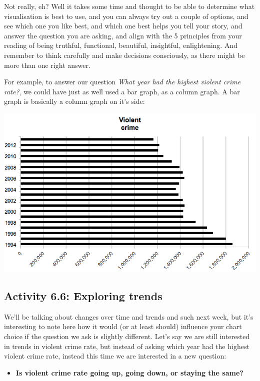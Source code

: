 \documentclass[
]{book}
\providecommand{\tightlist}{%
  \setlength{\itemsep}{0pt}\setlength{\parskip}{0pt}}
\begin{document}
Not really, eh? Well it takes some time and thought to be able to determine what visualisation is best to use, and you can always try out a couple of options, and see which one you like best, and which one best helps you tell your story, and answer the question you are asking, and align with the 5 principles from your reading of being truthful, functional, beautiful, insightful, enlightening. And remember to think carefully and make decisions consciously, as there might be more than one right answer.

For example, to answer our question \emph{What year had the highest violent crime rate?}, we could have just as well used a bar graph, as a column graph. A bar graph is basically a column graph on it's side:

\includegraphics{imgs/bar_same_col.png}

\hypertarget{activity-6.6-exploring-trends}{%
\subsection{Activity 6.6: Exploring trends}\label{activity-6.6-exploring-trends}}

We'll be talking about changes over time and trends and such next week, but it's interesting to note here how it would (or at least should) influence your chart choice if the question we ask is slightly different. Let's say we are still interested in trends in violent crime rate, but instead of asking which year had the highest violent crime rate, instead this time we are interested in a new question:

\begin{itemize}
\tightlist
\item
  \textbf{Is violent crime rate going up, going down, or staying the same?}
\end{itemize}
\end{document}
